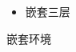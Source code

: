 \documentclass{article}
\begin{document}
\begin{figure}
  \centering
  \begin{minipage}{0.5\textwidth}
    \begin{itemize}
      \item 嵌套三层
    \end{itemize}
  \end{minipage}
  \caption{嵌套环境}\label{fig:nest}
\end{figure}
\end{document}
